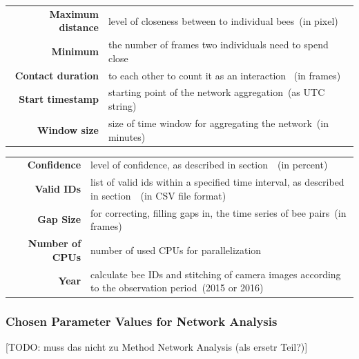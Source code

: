 \begin{table}[htbp]
\small
\centering
\begin{tabularx}{\textwidth}{@{} r Y @{}}
\textbf{Maximum distance} & level of closeness between to individual bees~(in pixel) \vspace{2mm} \\
\textbf{Minimum} & the number of frames two individuals need to spend close\\
\textbf{Contact duration} &  to each other to count it as an interaction ~(in frames) \vspace{2mm} \\
\textbf{Start timestamp} & starting point of the network aggregation~(as UTC string) \vspace{2mm} \\
\textbf{Window size} & size of time window for aggregating the network~(in minutes) \vspace{4mm}\\
\end{tabularx}
\end{table}

\begin{table}[htbp]
\small
\centering
\begin{tabularx}{\textwidth}{@{} r Y @{}}
\textbf{Confidence} & level of confidence, as described in section~~(in percent) \vspace{2mm}\\
\textbf{Valid IDs} & list of valid ids within a specified time interval, as described in section~~(in CSV file format) \vspace{2mm}\\
\textbf{Gap Size} & for correcting, filling gaps in, the time series of bee pairs~(in frames) \vspace{2mm}\\
\textbf{Number of CPUs} & number of used CPUs for parallelization \vspace{2mm}\\
\textbf{Year} & calculate bee IDs and stitching of camera images according to the observation period~(2015 or 2016)\\
\end{tabularx}
\end{table}

\subsubsection{Chosen Parameter Values for Network Analysis}
[TODO: muss das nicht zu Method Network Analysis (als ersetr Teil?)]

